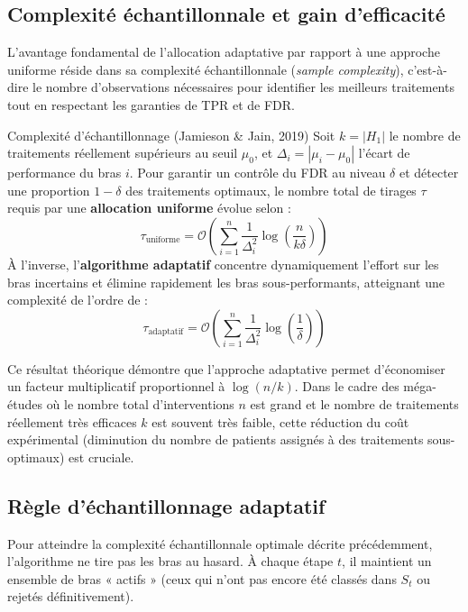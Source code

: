 \documentclass[11pt,a4paper]{article}
\newcommand{\calO}{\mathcal{O}}
\newcommand{\Halt}{H_1}
\begin{document}
\subsection{Complexité échantillonnale et gain d'efficacité}

L'avantage fondamental de l'allocation adaptative par rapport à une approche uniforme réside dans sa complexité échantillonnale (\textit{sample complexity}), c'est-à-dire le nombre d'observations nécessaires pour identifier les meilleurs traitements tout en respectant les garanties de TPR et de FDR.

\begin{theorem}{Complexité d'échantillonnage (Jamieson \& Jain, 2019)}{}
  Soit $k = |\Halt|$ le nombre de traitements réellement supérieurs au seuil $\mu_0$, et $\Delta_i = |\mu_i - \mu_0|$ l'écart de performance du bras $i$. Pour garantir un contrôle du FDR au niveau $\delta$ et détecter une proportion $1-\delta$ des traitements optimaux, le nombre total de tirages $\tau$ requis par une \textbf{allocation uniforme} évolue selon :
  \[
    \tau_{\text{uniforme}} = \calO\left( \sum_{i=1}^n \frac{1}{\Delta_i^2} \log\left(\frac{n}{k\delta}\right) \right)
  \]
  À l'inverse, l'\textbf{algorithme adaptatif} concentre dynamiquement l'effort sur les bras incertains et élimine rapidement les bras sous-performants, atteignant une complexité de l'ordre de :
  \[
    \tau_{\text{adaptatif}} = \calO\left( \sum_{i=1}^n \frac{1}{\Delta_i^2} \log\left(\frac{1}{\delta}\right) \right)
  \]
\end{theorem}

Ce résultat théorique démontre que l'approche adaptative permet d'économiser un facteur multiplicatif proportionnel à $\log(n/k)$. Dans le cadre des méga-études \cite{bowen2022} où le nombre total d'interventions $n$ est grand et le nombre de traitements réellement très efficaces $k$ est souvent très faible, cette réduction du coût expérimental (diminution du nombre de patients assignés à des traitements sous-optimaux) est cruciale.

\subsection{Règle d'échantillonnage adaptatif}

Pour atteindre la complexité échantillonnale optimale décrite précédemment, l'algorithme ne tire pas les bras au hasard. À chaque étape $t$, il maintient un ensemble de bras « actifs » (ceux qui n'ont pas encore été classés dans $S_t$ ou rejetés définitivement).
\end{document}
